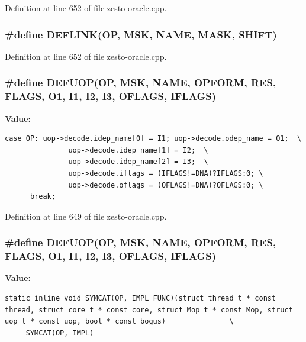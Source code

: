 Definition at line 652 of file zesto-oracle.cpp.
\subsubsection[{DEFLINK}]{\setlength{\rightskip}{0pt plus 5cm}\#define DEFLINK(OP, \/  MSK, \/  NAME, \/  MASK, \/  SHIFT)}\label{zesto-oracle_8cpp_e2e57a47696d1134596738df09c2a5f2}




Definition at line 652 of file zesto-oracle.cpp.
\subsubsection[{DEFUOP}]{\setlength{\rightskip}{0pt plus 5cm}\#define DEFUOP(OP, \/  MSK, \/  NAME, \/  OPFORM, \/  RES, \/  FLAGS, \/  O1, \/  I1, \/  I2, \/  I3, \/  OFLAGS, \/  IFLAGS)}\label{zesto-oracle_8cpp_f554fbf4d732dcec84d863e7903d8c86}


\textbf{Value:}

\begin{Code}\begin{verbatim}case OP: uop->decode.idep_name[0] = I1; uop->decode.odep_name = O1;  \
               uop->decode.idep_name[1] = I2;  \
               uop->decode.idep_name[2] = I3;  \
               uop->decode.iflags = (IFLAGS!=DNA)?IFLAGS:0; \
               uop->decode.oflags = (OFLAGS!=DNA)?OFLAGS:0; \
      break;
\end{verbatim}
\end{Code}


Definition at line 649 of file zesto-oracle.cpp.
\subsubsection[{DEFUOP}]{\setlength{\rightskip}{0pt plus 5cm}\#define DEFUOP(OP, \/  MSK, \/  NAME, \/  OPFORM, \/  RES, \/  FLAGS, \/  O1, \/  I1, \/  I2, \/  I3, \/  OFLAGS, \/  IFLAGS)}\label{zesto-oracle_8cpp_f554fbf4d732dcec84d863e7903d8c86}


\textbf{Value:}

\begin{Code}\begin{verbatim}static inline void SYMCAT(OP,_IMPL_FUNC)(struct thread_t * const thread, struct core_t * const core, struct Mop_t * const Mop, struct uop_t * const uop, bool * const bogus)               \
     SYMCAT(OP,_IMPL)
\end{verbatim}
\end{Code}


